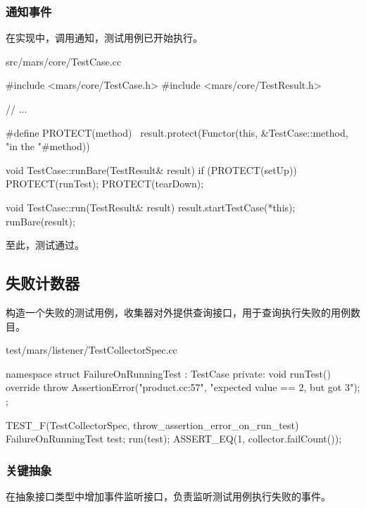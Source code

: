 \begin{content}
\subsubsection{通知事件}

在实现中，调用通知，测试用例已开始执行。

\begin{nodiff}{src/mars/core/TestCase.cc}
 \begin{c++}
#include <mars/core/TestCase.h>
#include <mars/core/TestResult.h>

// ...

#define PROTECT(method) \
  result.protect(Functor(this, &TestCase::method,  "in the "#method))

void TestCase::runBare(TestResult& result) {
  if (PROTECT(setUp)) {
    PROTECT(runTest);
  }
  PROTECT(tearDown);
}

void TestCase::run(TestResult& result) {
  result.startTestCase(*this);
  runBare(result);
}
 \end{c++}
\end{nodiff}

至此，测试通过。

\subsection{失败计数器}

构造一个失败的测试用例，收集器对外提供查询接口，用于查询执行失败的用例数目。

\begin{nodiff}{test/mars/listener/TestCollectorSpec.cc}
 \begin{c++}
namespace {
  struct FailureOnRunningTest : TestCase {
  private:
    void runTest() override {
      throw AssertionError("product.cc:57", "expected value == 2, but got 3");
    }
  };
}

TEST_F(TestCollectorSpec, throw_assertion_error_on_run_test) {
  FailureOnRunningTest test;
  run(test);
  ASSERT_EQ(1, collector.failCount());
}
 \end{c++}
\end{nodiff}

\subsubsection{关键抽象}

在抽象接口类型中增加事件监听接口，负责监听测试用例执行失败的事件。


\end{content}
